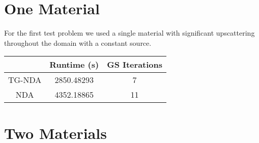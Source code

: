 \section{One Material}
For the first test problem we used a single material with significant upscattering throughout the domain with a constant source. 
\begin{center}
    \begin{tabular}{|c|c|c|}
    \hline
    & Runtime (s) & GS Iterations \\
    \hline
    TG-NDA & 2850.48293 & 7 \\
    NDA & 4352.18865 & 11 \\
    \hline
    \end{tabular}
\end{center}
\section{Two Materials}